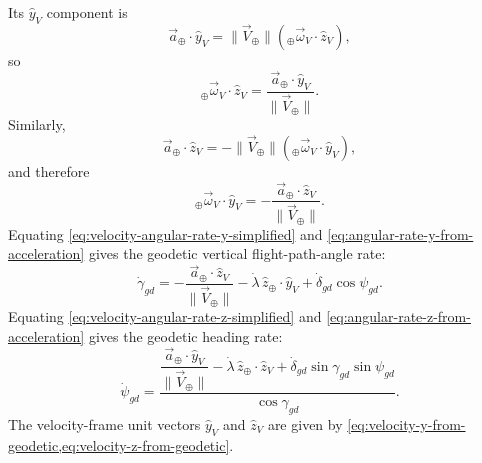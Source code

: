Its $\hat y_V$ component is
\begin{equation}
  \vec a_{\oplus}\mathbin{\cdot}\hat y_V
  =\lVert\vec V_{\oplus}\rVert
    \left({}_{\oplus}\vec\omega_V\mathbin{\cdot}\hat z_V\right),
  \label{eq:acceleration-yv-component}
\end{equation}
so
\begin{equation}
  {}_{\oplus}\vec\omega_V\mathbin{\cdot}\hat z_V
  =\frac{\vec a_{\oplus}\mathbin{\cdot}\hat y_V}
         {\lVert\vec V_{\oplus}\rVert}.
  \label{eq:angular-rate-z-from-acceleration}
\end{equation}
Similarly,
\begin{equation}
  \vec a_{\oplus}\mathbin{\cdot}\hat z_V
  =-\lVert\vec V_{\oplus}\rVert
    \left({}_{\oplus}\vec\omega_V\mathbin{\cdot}\hat y_V\right),
  \label{eq:acceleration-zv-component}
\end{equation}
and therefore
\begin{equation}
  {}_{\oplus}\vec\omega_V\mathbin{\cdot}\hat y_V
  =-\frac{\vec a_{\oplus}\mathbin{\cdot}\hat z_V}
          {\lVert\vec V_{\oplus}\rVert}.
  \label{eq:angular-rate-y-from-acceleration}
\end{equation}
Equating \cref{eq:velocity-angular-rate-y-simplified} and
\cref{eq:angular-rate-y-from-acceleration} gives the geodetic vertical
flight-path-angle rate:
\begin{equation}
  \dot\gamma_{gd}
  =-\frac{\vec a_{\oplus}\mathbin{\cdot}\hat z_V}
          {\lVert\vec V_{\oplus}\rVert}
   -\dot\lambda\,\hat z_{\oplus}\mathbin{\cdot}\hat y_V
   +\dot\delta_{gd}\cos\psi_{gd}.
  \label{eq:geodetic-flight-path-angle-rate}
\end{equation}
Equating \cref{eq:velocity-angular-rate-z-simplified} and
\cref{eq:angular-rate-z-from-acceleration} gives the geodetic heading rate:
\begin{equation}
  \dot\psi_{gd}
  =\frac{
    \dfrac{\vec a_{\oplus}\mathbin{\cdot}\hat y_V}
          {\lVert\vec V_{\oplus}\rVert}
    -\dot\lambda\,\hat z_{\oplus}\mathbin{\cdot}\hat z_V
    +\dot\delta_{gd}\sin\gamma_{gd}\sin\psi_{gd}
  }{\cos\gamma_{gd}}.
  \label{eq:geodetic-heading-rate}
\end{equation}
The velocity-frame unit vectors $\hat y_V$ and $\hat z_V$ are given by
\cref{eq:velocity-y-from-geodetic,eq:velocity-z-from-geodetic}.
